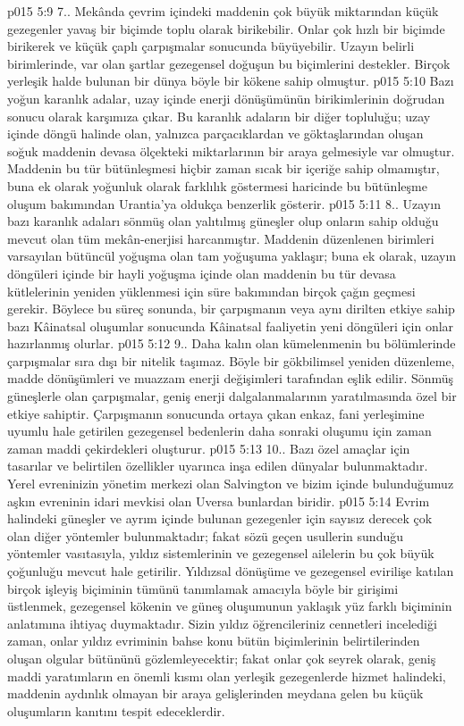 \vs p015 5:9 7.\bibnobreakspace {}. Mekânda çevrim içindeki maddenin çok büyük miktarından küçük gezegenler yavaş bir biçimde toplu olarak birikebilir. Onlar çok hızlı bir biçimde birikerek ve küçük çaplı çarpışmalar sonucunda büyüyebilir. Uzayın belirli birimlerinde, var olan şartlar gezegensel doğuşun bu biçimlerini destekler. Birçok yerleşik halde bulunan bir dünya böyle bir kökene sahip olmuştur.
\vs p015 5:10 Bazı yoğun karanlık adalar, uzay içinde enerji dönüşümünün birikimlerinin doğrudan sonucu olarak karşımıza çıkar. Bu karanlık adaların bir diğer topluluğu; uzay içinde döngü halinde olan, yalnızca parçacıklardan ve göktaşlarından oluşan soğuk maddenin devasa ölçekteki miktarlarının bir araya gelmesiyle var olmuştur. Maddenin bu tür bütünleşmesi hiçbir zaman sıcak bir içeriğe sahip olmamıştır, buna ek olarak yoğunluk olarak farklılık göstermesi haricinde bu bütünleşme oluşum bakımından Urantia’ya oldukça benzerlik gösterir.
\vs p015 5:11 8.\bibnobreakspace {}. Uzayın bazı karanlık adaları sönmüş olan yalıtılmış güneşler olup onların sahip olduğu mevcut olan tüm mekân\hyp{}enerjisi harcanmıştır. Maddenin düzenlenen birimleri varsayılan bütüncül yoğuşma olan tam yoğuşuma yaklaşır; buna ek olarak, uzayın döngüleri içinde bir hayli yoğuşma içinde olan maddenin bu tür devasa kütlelerinin yeniden yüklenmesi için süre bakımından birçok çağın geçmesi gerekir. Böylece bu süreç sonunda, bir çarpışmanın veya aynı dirilten etkiye sahip bazı Kâinatsal oluşumlar sonucunda Kâinatsal faaliyetin yeni döngüleri için onlar hazırlanmış olurlar.
\vs p015 5:12 9.\bibnobreakspace {}. Daha kalın olan kümelenmenin bu bölümlerinde çarpışmalar sıra dışı bir nitelik taşımaz. Böyle bir gökbilimsel yeniden düzenleme, madde dönüşümleri ve muazzam enerji değişimleri tarafından eşlik edilir. Sönmüş güneşlerle olan çarpışmalar, geniş enerji dalgalanmalarının yaratılmasında özel bir etkiye sahiptir. Çarpışmanın sonucunda ortaya çıkan enkaz, fani yerleşimine uyumlu hale getirilen gezegensel bedenlerin daha sonraki oluşumu için zaman zaman maddi çekirdekleri oluşturur.
\vs p015 5:13 10.\bibnobreakspace {}. Bazı özel amaçlar için tasarılar ve belirtilen özellikler uyarınca inşa edilen dünyalar bulunmaktadır. Yerel evreninizin yönetim merkezi olan Salvington ve bizim içinde bulunduğumuz aşkın evreninin idari mevkisi olan Uversa bunlardan biridir.
\vs p015 5:14 Evrim halindeki güneşler ve ayrım içinde bulunan gezegenler için sayısız derecek çok olan diğer yöntemler bulunmaktadır; fakat sözü geçen usullerin sunduğu yöntemler vasıtasıyla, yıldız sistemlerinin ve gezegensel ailelerin bu çok büyük çoğunluğu mevcut hale getirilir. Yıldızsal dönüşüme ve gezegensel evirilişe katılan birçok işleyiş biçiminin tümünü tanımlamak amacıyla böyle bir girişimi üstlenmek, gezegensel kökenin ve güneş oluşumunun yaklaşık yüz farklı biçiminin anlatımına ihtiyaç duymaktadır. Sizin yıldız öğrencileriniz cennetleri incelediği zaman, onlar yıldız evriminin bahse konu bütün biçimlerinin belirtilerinden oluşan olgular bütününü gözlemleyecektir; fakat onlar çok seyrek olarak, geniş maddi yaratımların en önemli kısmı olan yerleşik gezegenlerde hizmet halindeki, maddenin aydınlık olmayan bir araya gelişlerinden meydana gelen bu küçük oluşumların kanıtını tespit edeceklerdir.
